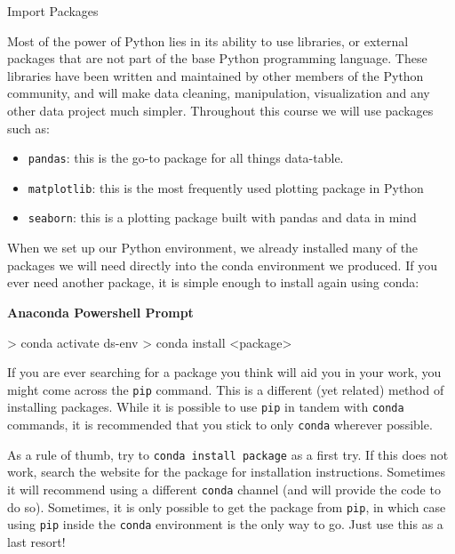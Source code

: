 \documentclass[
  letterpaper,
  DIV=11,
  numbers=noendperiod]{scrreprt}
\newenvironment{Shaded}{\begin{snugshade}}{\end{snugshade}}
\newcommand{\ExtensionTok}[1]{\textcolor[rgb]{0.00,0.23,0.31}{#1}}
\newcommand{\FunctionTok}[1]{\textcolor[rgb]{0.28,0.35,0.67}{#1}}
\newcommand{\NormalTok}[1]{\textcolor[rgb]{0.00,0.23,0.31}{#1}}
\newcommand{\OperatorTok}[1]{\textcolor[rgb]{0.37,0.37,0.37}{#1}}
\providecommand{\tightlist}{%
  \setlength{\itemsep}{0pt}\setlength{\parskip}{0pt}}\usepackage{longtable,booktabs,array}
\begin{document}
Import Packages

Most of the power of Python lies in its ability to use libraries, or
external packages that are not part of the base Python programming
language. These libraries have been written and maintained by other
members of the Python community, and will make data cleaning,
manipulation, visualization and any other data project much simpler.
Throughout this course we will use packages such as:

\begin{itemize}
\tightlist
\item
  \texttt{pandas}: this is the go-to package for all things data-table.
\item
  \texttt{matplotlib}: this is the most frequently used plotting package
  in Python
\item
  \texttt{seaborn}: this is a plotting package built with pandas and
  data in mind
\end{itemize}

When we set up our Python environment, we already installed many of the
packages we will need directly into the conda environment we produced.
If you ever need another package, it is simple enough to install again
using conda:

\textbf{Anaconda Powershell Prompt}

\begin{Shaded}
\begin{Highlighting}[]
\OperatorTok{\textgreater{}}\NormalTok{ conda }\ExtensionTok{activate}\NormalTok{ ds{-}env}
\OperatorTok{\textgreater{}}\NormalTok{ conda }\FunctionTok{install} \OperatorTok{\textless{}}\NormalTok{package}\OperatorTok{\textgreater{}}
\end{Highlighting}
\end{Shaded}

\begin{tcolorbox}[enhanced jigsaw, rightrule=.15mm, opacitybacktitle=0.6, colback=white, toprule=.15mm, colframe=quarto-callout-tip-color-frame, bottomtitle=1mm, bottomrule=.15mm, arc=.35mm, coltitle=black, breakable, title=\textcolor{quarto-callout-tip-color}{\faLightbulb}\hspace{0.5em}{To Pip or not to Pip?}, titlerule=0mm, opacityback=0, colbacktitle=quarto-callout-tip-color!10!white, left=2mm, toptitle=1mm, leftrule=.75mm]
If you are ever searching for a package you think will aid you in your
work, you might come across the \texttt{pip} command. This is a
different (yet related) method of installing packages. While it is
possible to use \texttt{pip} in tandem with \texttt{conda} commands, it
is recommended that you stick to only \texttt{conda} wherever possible.

As a rule of thumb, try to \texttt{conda\ install\ package} as a first
try. If this does not work, search the website for the package for
installation instructions. Sometimes it will recommend using a different
\texttt{conda} channel (and will provide the code to do so). Sometimes,
it is only possible to get the package from \texttt{pip}, in which case
using \texttt{pip} inside the \texttt{conda} environment is the only way
to go. Just use this as a last resort!
\end{tcolorbox}
\end{document}
